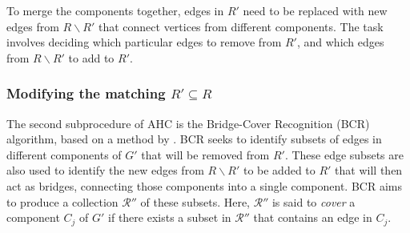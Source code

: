 \documentclass[a4paper,11pt,authoryear]{elsarticle}
\begin{document}
\noindent To merge the components together, edges in $R'$ need to be replaced with new edges from $R \backslash R'$ that connect vertices from different components. The task involves deciding which particular edges to remove from $R'$, and which edges from $R \backslash R'$ to add to $R'$.

\subsubsection{Modifying the matching $R' \subseteq R$}
\label{subsub:bcr}
\noindent The second subprocedure of AHC is the Bridge-Cover Recognition (BCR) algorithm, based on a method by \cite{becker2010}. BCR seeks to identify subsets of edges in different components of $G'$ that will be removed from $R'$. These edge subsets are also used to identify the new edges from $R \backslash R'$ to be added to $R'$ that will then act as bridges, connecting those components into a single component. BCR aims to produce a collection $\mathcal{R}''$ of these subsets. Here, $\mathcal{R}''$ is said to \emph{cover} a component $C_j$ of $G'$ if there exists a subset in $\mathcal{R}''$ that contains an edge in $C_j$.
\end{document}
